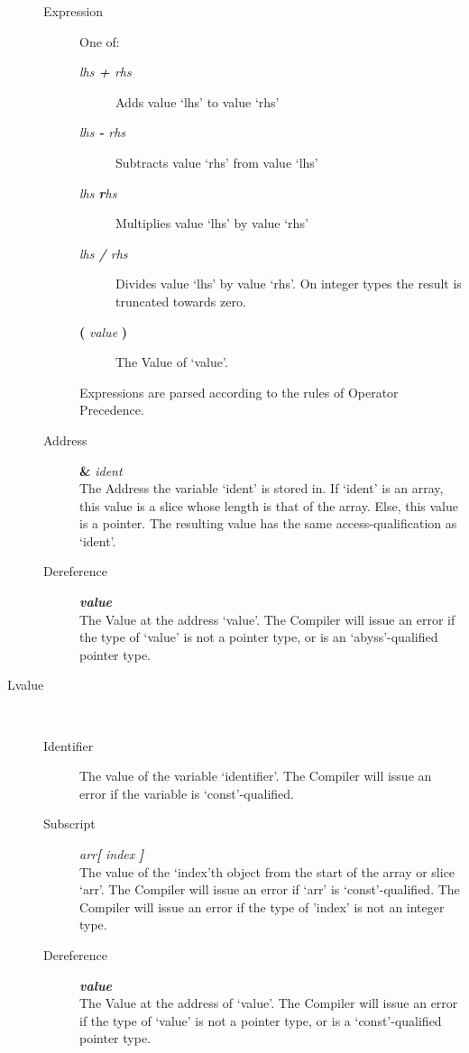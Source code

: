 \documentclass{article}
\begin{document}
\begin{description}
\begin{description}
		\item[Expression]
			One of:
			\begin{description}
			\item[\textit{lhs \textbf + rhs}] Adds value `lhs' to value `rhs'
			\item[\textit{lhs \textbf - rhs}] Subtracts value `rhs' from value `lhs'
			\item[\textit{lhs \textbf * rhs}] Multiplies value `lhs' by value `rhs'
			\item[\textit{lhs \textbf / rhs}] Divides value `lhs' by value `rhs'. On integer types the result is truncated towards zero.
			\item[\textbf ( \textit{value} \textbf )] The Value of `value'.
			\end{description}
			Expressions are parsed according to the rules of Operator Precedence.

		\item[Address] \textbf \& \textit{ident} \\
			The Address the variable `ident' is stored in. If `ident' is an array, this value is a slice whose length is that of the array.
			Else, this value is a pointer.
			The resulting value has the same access-qualification as `ident'.

		\item[Dereference] \textbf * \textit{value} \\
			The Value at the address `value'. The Compiler will issue an error if the type of `value' is not a pointer type, or is an `abyss'-qualified pointer type.

		\end{description}

	\item[Lvalue] \hfill \\
		\begin{description}
		\item[Identifier] The value of the variable `identifier'. The Compiler will issue an error if the variable is `const'-qualified.

		\item[Subscript] \textit{arr\textbf[ index \textbf]} \\
			The value of the `index'th object from the start of the array or slice `arr'.
			The Compiler will issue an error if `arr' is `const'-qualified.
			The Compiler will issue an error if the type of 'index' is not an integer type.

		\item[Dereference] \textbf * \textit{value} \\
			The Value at the address of `value'. The Compiler will issue an error if the type of `value' is not a pointer type, or is a `const'-qualified pointer type.


\end{description}
\end{description}
\end{document}
